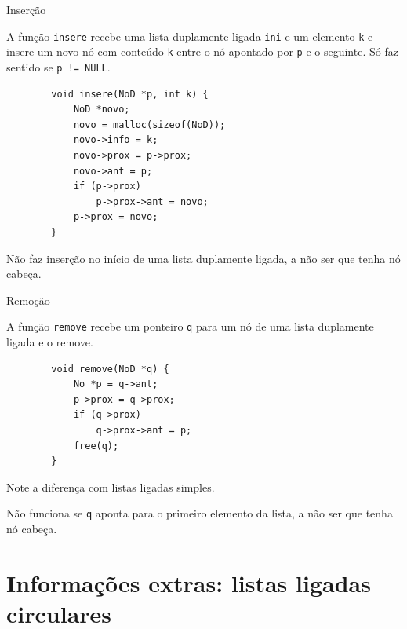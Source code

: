 \documentclass{beamer}
\newcommand{\cod}[1]{\texttt{#1}}
\begin{document}
\begin{frame}[fragile]{Inserção}

    A função \cod{insere} recebe uma lista duplamente ligada \cod{ini} e um elemento \cod{k} e insere um novo nó com conteúdo \cod{k} entre o nó apontado por \cod{p} e o seguinte.
    Só faz sentido se \cod{p != NULL}.

    \begin{verbatim}
        void insere(NoD *p, int k) {
            NoD *novo;
            novo = malloc(sizeof(NoD));
            novo->info = k;
            novo->prox = p->prox;
            novo->ant = p;
            if (p->prox)
                p->prox->ant = novo;
            p->prox = novo;
        }
    \end{verbatim}

    Não faz inserção no início de uma lista duplamente ligada, a não ser que tenha nó cabeça.
\end{frame}

\begin{frame}[fragile]{Remoção}

    A função \cod{remove} recebe um ponteiro \cod{q} para um nó de uma lista duplamente ligada e o remove.

    \begin{verbatim}
        void remove(NoD *q) {
            No *p = q->ant;
            p->prox = q->prox;
            if (q->prox)
                q->prox->ant = p;
            free(q);
        }
    \end{verbatim}

    Note a diferença com listas ligadas simples.

    Não funciona se \cod{q} aponta para o primeiro elemento da lista, a não ser que tenha nó cabeça.
\end{frame}

\section{Informações extras: listas ligadas circulares}
\end{document}
